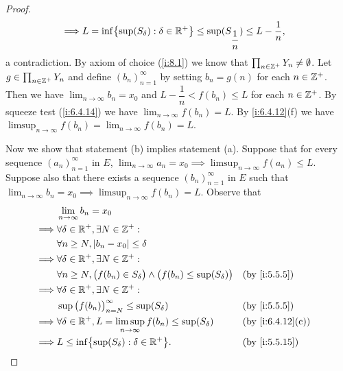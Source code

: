 \begin{proof}
\begin{align*}
    \implies & L = \inf\set{\sup(S_{\delta}) : \delta \in \R^+} \leq \sup(S_{\dfrac{1}{n}}) \leq L - \dfrac{1}{n},
  \end{align*}
  a contradiction.
  By axiom of choice (\cref{i:8.1}) we know that \(\prod_{n \in \mathbb{Z}^+} Y_n \neq \emptyset\).
  Let \(g \in \prod_{n \in \mathbb{Z}^+} Y_n\) and define \((b_n)_{n = 1}^\infty\) by setting \(b_n = g(n)\) for each \(n \in \mathbb{Z}^+\).
  Then we have \(\lim_{n \to \infty} b_n = x_0\) and \(L - \dfrac{1}{n} < f(b_n) \leq L\) for each \(n \in \mathbb{Z}^+\).
  By squeeze test (\cref{i:6.4.14}) we have \(\lim_{n \to \infty} f(b_n) = L\).
  By \cref{i:6.4.12}(f) we have \(\limsup_{n \to \infty} f(b_n) = \lim_{n \to \infty} f(b_n) = L\).

  Now we show that statement (b) implies statement (a).
  Suppose that for every sequence \((a_n)_{n = 1}^\infty\) in \(E\), \(\lim_{n \to \infty} a_n = x_0 \implies \limsup_{n \to \infty} f(a_n) \leq L\).
  Suppose also that there exists a sequence \((b_n)_{n = 1}^\infty\) in \(E\) such that \(\lim_{n \to \infty} b_n = x_0 \implies \limsup_{n \to \infty} f(b_n) = L\).
  Observe that
  \begin{align*}
             & \lim_{n \to \infty} b_n = x_0                                                                                        \\
    \implies & \forall \delta \in \R^+, \exists N \in \Z^+ :                                                                        \\
             & \forall n \geq N, \abs{b_n - x_0} \leq \delta                                                                        \\
    \implies & \forall \delta \in \R^+, \exists N \in \Z^+ :                                                                        \\
             & \forall n \geq N, \big(f(b_n) \in S_{\delta}\big) \land \big(f(b_n) \leq \sup(S_{\delta})\big) &  & \by{i:5.5.5}     \\
    \implies & \forall \delta \in \R^+, \exists N \in \Z^+ :                                                                        \\
             & \sup\big(f(b_n)\big)_{n = N}^\infty \leq \sup(S_{\delta})                                      &  & \by{i:5.5.5}     \\
    \implies & \forall \delta \in \R^+, L = \limsup_{n \to \infty} f(b_n) \leq \sup(S_{\delta})               &  & \by{i:6.4.12}[c] \\
    \implies & L \leq \inf\set{\sup(S_{\delta}) : \delta \in \R^+}.                                           &  & \by{i:5.5.15}

\end{align*}
\end{proof}
